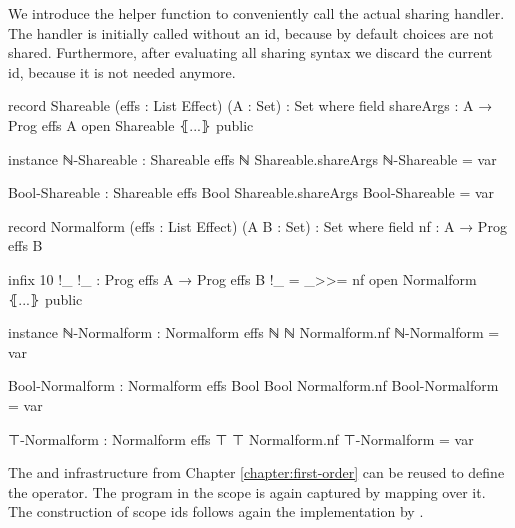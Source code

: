 We introduce the helper function  to conveniently call
the actual sharing handler.
The handler is initially called without an id, because by default choices are
not shared.
Furthermore, after evaluating all sharing syntax we discard the current id,
because it is not needed anymore.

\begin{code}[hide]
record Shareable (effs : List Effect) (A : Set) : Set where
  field shareArgs : A → Prog effs A
open Shareable ⦃...⦄ public

instance
  ℕ-Shareable : Shareable effs ℕ
  Shareable.shareArgs ℕ-Shareable = var

  Bool-Shareable : Shareable effs Bool
  Shareable.shareArgs Bool-Shareable = var

record Normalform (effs : List Effect) (A B : Set) : Set where
  field nf : A → Prog effs B

  infix 10 !_
  !_ : Prog effs A → Prog effs B
  !_ = _>>= nf
open Normalform ⦃...⦄ public

instance
  ℕ-Normalform : Normalform effs ℕ ℕ
  Normalform.nf ℕ-Normalform = var

  Bool-Normalform : Normalform effs Bool Bool
  Normalform.nf Bool-Normalform = var

  ⊤-Normalform : Normalform effs ⊤ ⊤
  Normalform.nf ⊤-Normalform = var
\end{code}

The  and  infrastructure from
Chapter \ref{chapter:first-order} can be reused to define the
 operator.
The program in the scope is again captured by mapping  over it.
The construction of scope ids follows again the implementation by
\textcite{bunkenburg2019modeling}.


